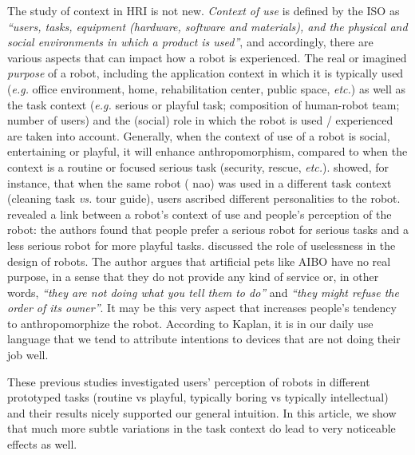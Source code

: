 \documentclass[lettersize, noapacite, twoside, HRI]{apa_HRI}
\newcommand{\eg}{\textit{e.g.}\xspace}
\newcommand{\etc}{\textit{etc.}\xspace}
\newcommand{\vs}{\textit{vs.}\xspace}
\begin{document}
The study of context in HRI is not new. \textit{Context of use} is defined by
the ISO as \textit{``users, tasks, equipment (hardware, software and materials),
and the physical and social environments in which a product is used''}, and
accordingly, there are various aspects that can impact how a robot is
experienced. The real or imagined \textit{purpose} of a robot, including the
application context in which it is typically used (\eg office environment, home,
rehabilitation center, public space, \etc) as well as the task context (\eg
serious or playful task; composition of human-robot team; number of users) and
the (social) role in which the robot is used / experienced are taken into
account. Generally, when the context of use of a robot is social, entertaining
or playful, it will enhance anthropomorphism, compared to when the context is a
routine or focused serious task (security, rescue, \etc).
\cite{joosse_what_2013} showed, for instance, that when the same robot ({\sc
nao}) was used in a different task context (cleaning task \vs tour guide), users
ascribed different personalities to the robot. \cite{goetz_cooperation_2002}
revealed a link between a robot's context of use and people's perception of the
robot: the authors found that people prefer a serious robot for serious tasks
and a less serious robot for more playful tasks. \cite{kaplan_free_2000}
discussed the role of uselessness in the design of robots. The author argues
that artificial pets like AIBO have no real purpose, in a sense that they do not
provide any kind of service or, in other words, \textit{``they are not doing
what you tell them to do''} and \textit{``they might refuse the order of its
owner''}. It may be this very aspect that increases people's tendency to
anthropomorphize the robot. According to Kaplan, it is in our daily use language
that we tend to attribute intentions to devices that are not doing their job
well.

These previous studies investigated users' perception of robots in
different prototyped tasks (routine vs playful, typically boring vs typically
intellectual) and their results nicely supported our general intuition.
In this article, we show that much more subtle variations in the task context do
lead to very noticeable effects as well.
\end{document}
